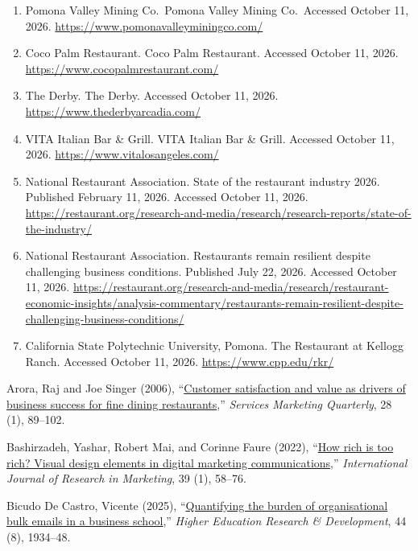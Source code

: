 \documentclass[
  12pt,
  letterpaper,
  DIV=11,
  numbers=noendperiod]{scrartcl}
\newlength{\cslhangindent}
\newenvironment{CSLReferences}[2] %
 {\begin{list}{}{%
  \setlength{\itemindent}{0pt}
  \setlength{\leftmargin}{0pt}
  \setlength{\parsep}{0pt}
  \ifodd #1
   \setlength{\leftmargin}{\cslhangindent}
   \setlength{\itemindent}{-1\cslhangindent}
  \fi
  \setlength{\itemsep}{#2\baselineskip}}}
 {\end{list}}
\begin{document}
\label{refs}
\begin{CSLReferences}{1}{0}
\begin{enumerate}
\def\labelenumi{\arabic{enumi}.}
\item
  Pomona Valley Mining Co.~Pomona Valley Mining Co.~Accessed October 11,
  2026. \url{https://www.pomonavalleyminingco.com/}
\item
  Coco Palm Restaurant. Coco Palm Restaurant. Accessed October 11, 2026.
  \url{https://www.cocopalmrestaurant.com/}
\item
  The Derby. The Derby. Accessed October 11, 2026.
  \url{https://www.thederbyarcadia.com/}
\item
  VITA Italian Bar \& Grill. VITA Italian Bar \& Grill. Accessed October
  11, 2026. \url{https://www.vitalosangeles.com/}
\item
  National Restaurant Association. State of the restaurant industry
  2026. Published February 11, 2026. Accessed October 11, 2026.
  \url{https://restaurant.org/research-and-media/research/research-reports/state-of-the-industry/}
\item
  National Restaurant Association. Restaurants remain resilient despite
  challenging business conditions. Published July 22, 2026. Accessed
  October 11, 2026.
  \url{https://restaurant.org/research-and-media/research/restaurant-economic-insights/analysis-commentary/restaurants-remain-resilient-despite-challenging-business-conditions/}
\item
  California State Polytechnic University, Pomona. The Restaurant at
  Kellogg Ranch. Accessed October 11, 2026.
  \url{https://www.cpp.edu/rkr/}
\end{enumerate}

Arora, Raj and Joe Singer (2006),
{``\href{https://doi.org/10.1300/J396v28n01_05}{Customer satisfaction
and value as drivers of business success for fine dining
restaurants},''} \emph{Services Marketing Quarterly}, 28 (1), 89--102.

Bashirzadeh, Yashar, Robert Mai, and Corinne Faure (2022),
{``\href{https://doi.org/10.1016/j.ijresmar.2021.06.008}{How rich is too
rich? Visual design elements in digital marketing communications},''}
\emph{International Journal of Research in Marketing}, 39 (1), 58--76.

Bicudo De Castro, Vicente (2025),
{``\href{https://doi.org/10.1080/07294360.2025.2510662}{Quantifying the
burden of organisational bulk emails in a business school},''}
\emph{Higher Education Research \& Development}, 44 (8), 1934--48.


\end{CSLReferences}
\end{document}
